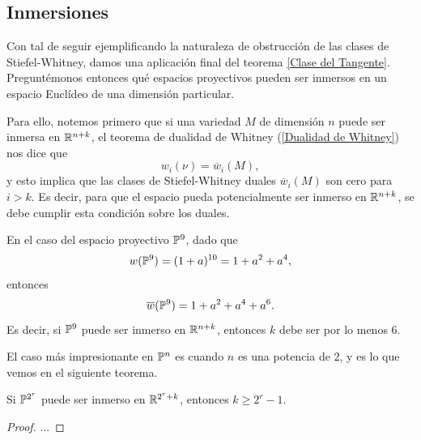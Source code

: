 \subsection{Inmersiones}

Con tal de seguir ejemplificando la naturaleza de obstrucción de las clases de Stiefel-Whitney, damos una aplicación final del teorema \ref{Clase del Tangente}. Preguntémonos entonces qué espacios proyectivos pueden ser inmersos en un espacio Euclídeo de una dimensión particular. \par
Para ello, notemos primero que si una variedad $M$ de dimensión $n$ puede ser inmersa en $\R^{n+k}$, el teorema de dualidad de Whitney (\ref{Dualidad de Whitney}) nos dice que
\[ w_{i}(\nu) = \overline{w}_{i}(M), \]
y esto implica que las clases de Stiefel-Whitney duales $\overline{w}_{i}(M)$ son cero para $i > k$. Es decir, para que el espacio pueda potencialmente ser inmerso en $\R^{n+k}$, se debe cumplir esta condición sobre los duales.

\begin{example}
	En el caso del espacio proyectivo $\P^{9}$, dado que
	\[ w(\P^{9}) = (1 + a)^{10} = 1 + a^{2} + a^{4}, \]
	entonces
	\[ \overline{w}(\P^{9}) = 1 + a^{2} + a^{4} + a^{6}. \]
	Es decir, si $\P^{9}$ puede ser inmerso en $\R^{n + k}$, entonces $k$ debe ser por lo menos $6$.
\end{example}

El caso más impresionante en $\P^{n}$ es cuando $n$ es una potencia de $2$, y es lo que vemos en el siguiente teorema.

\begin{theorem}
	Si $\P^{2^{r}}$ puede ser inmerso en $\R^{2^{r} + k}$, entonces $k \geq 2^{r} - 1$.
\end{theorem}
\begin{proof}
	...
\end{proof}
